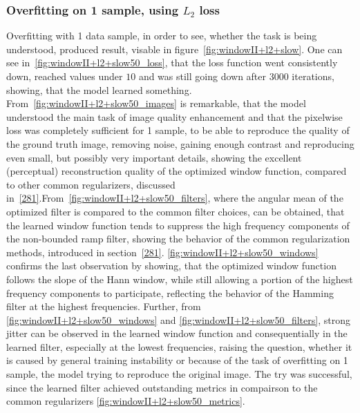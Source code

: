 \documentclass[12pt,a4paper]{article}
\begin{document}
\subsubsection{Overfitting on 1 sample, using $L_2$ loss}

 Overfitting with 1 data sample, in order to see, whether the task is being understood, produced result, visable in figure~\ref{fig:windowII+l2+slow}. One can see in~\ref{fig:windowII+l2+slow50_loss}, that the loss function went consistently down, reached values under $10$ and was still going down after $3000$ iterations, showing, that the model learned something. From~\ref{fig:windowII+l2+slow50_images} is remarkable, that the model understood the main task of image quality enhancement and that the pixelwise loss was completely sufficient for 1 sample, to be able to reproduce the quality of the ground truth image, removing noise, gaining enough contrast and reproducing even small, but possibly very important details, showing the excellent (perceptual) reconstruction quality of the optimized window function, compared to other common regularizers, discussed in~\ref{281}.From~\ref{fig:windowII+l2+slow50_filters}, where the angular mean of the optimized filter is compared to the common filter choices, can be obtained, that the learned window function tends to suppress the high frequency components of the non-bounded ramp filter, showing the behavior of the common regularization methods, introduced in section~\ref{281}. \ref{fig:windowII+l2+slow50_windows} confirms the last observation by showing, that the optimized window function follows the slope of the Hann window, while still allowing a portion of the highest frequency components to participate, reflecting the behavior of the Hamming filter at the highest frequencies. Further, from \ref{fig:windowII+l2+slow50_windows} and \ref{fig:windowII+l2+slow50_filters}, strong jitter can be observed in the learned window function and consequentially in the learned filter, especially at the lowest frequencies, raising the question, whether it is caused by general training instability or because of the task of overfitting on 1 sample, the model trying to reproduce the original image. The try was successful, since the learned filter achieved outstanding metrics in compairson to the common regularizers \ref{fig:windowII+l2+slow50_metrics}.
\end{document}
